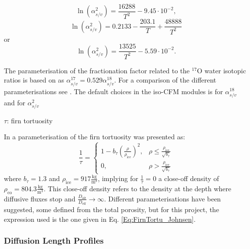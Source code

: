 \documentclass[../../CompleteThesis2/Complete_2ndDraft]{subfiles}
\begin{document}
\begin{equation}
	\ln(\alpha_{s/v}^{2}) = \frac{16288}{T^2} - 9.45\cdot 10^{-2},
	\label{Eq:FractFact2_Merlivat}
\end{equation}
\begin{equation}
	\ln(\alpha_{s/v}^{2}) = 0.2133 - \frac{203.1}{T} + \frac{48888}{T^2}
	\label{Eq:FractFact2_Ellehoj}
\end{equation}
or
\begin{equation}
	\ln(\alpha_{s/v}^{2}) =  \frac{13525}{T^2} - 5.59\cdot 10^{-2}.
	\label{Eq:FractFact2_Lamb}
\end{equation}

The parameterisation of the fractionation factor related to the $^{17}$O water isotopic ratios is based on \cite[Barkan and Luz, 2005]{BarkanLuz2005} as $\alpha_{s/v}^{17} = 0.529 \alpha_{s/v}^{18}$. For a comparison of the different parameterisations see \cite[Gkinis et al., 2021]{Gkinis2021}. The default choices in the iso-CFM modules is \cite[Majoube 1971]{Majoube1970} for $\alpha_{s/v}^{18}$ and \cite[Merlivat and Nief, 1967]{MerlivatNief1967} for $\alpha_{s/v}^{2}$

$\tau$: firn tortuosity

In \cite[Johnsen et al., 2000]{Johnsen2000} a parameterisation of the firn tortuosity was presented as:
\begin{equation}
	\frac{1}{\tau} = \begin{cases}
		1 - b_{\tau}\left(\frac{\rho}{\rho_{\text{ice}}}\right)^2,  & \rho \leq \frac{\rho_{\text{ice}}}{\sqrt{b_{\tau}}} \\
		0, & \rho > \frac{\rho_{\text{ice}}}{\sqrt{b_{\tau}}}
	\end{cases}
	\label{Eq:FirnTortu_Johnsen}
\end{equation}
where $b_{\tau} = 1.3$ and $\rho_{\text{ice}} = 917 \frac{\text{kg}}{\text{m}^3}$, implying for $\frac{1}{\tau}=0$ a close-off density of $\rho_{\text{co}} = 804.3 \frac{\text{kg}}{\text{m}^3}$. This close-off density refers to the density at the depth where diffusive fluxes stop and $\frac{D_{\text{air}}}{D_{\text{eff}}}\rightarrow \infty$. Different parameterisations have been suggested, some defined from the total porosity, but for this project, the expression used is the one given in Eq. \ref{Eq:FirnTortu_Johnsen}.

\subsubsection[Diffusion Length Profiles]{Diffusion Length Profiles}
\label{Subsubsec:Ice_DiffusionAndDensification_IsoCFM_DiffLenProfile}
\end{document}
